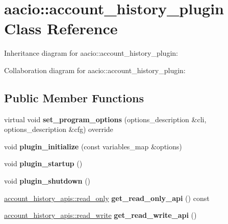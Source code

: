 \hypertarget{classaacio_1_1account__history__plugin}{}\section{aacio\+:\+:account\+\_\+history\+\_\+plugin Class Reference}
\label{classaacio_1_1account__history__plugin}


Inheritance diagram for aacio\+:\+:account\+\_\+history\+\_\+plugin\+:


Collaboration diagram for aacio\+:\+:account\+\_\+history\+\_\+plugin\+:
\subsection*{Public Member Functions}
\begin{DoxyCompactItemize}
\item 
\mbox{\label{classaacio_1_1account__history__plugin_a989ade7520170adb9238e6f84eca4984}} 
virtual void {\bfseries set\+\_\+program\+\_\+options} (options\+\_\+description \&cli, options\+\_\+description \&cfg) override
\item 
\mbox{\label{classaacio_1_1account__history__plugin_afe62f46f0268f571dbc670306050a225}} 
void {\bfseries plugin\+\_\+initialize} (const variables\+\_\+map \&options)
\item 
\mbox{\label{classaacio_1_1account__history__plugin_a11153dd33ce8928989bcb833d2fe9339}} 
void {\bfseries plugin\+\_\+startup} ()
\item 
\mbox{\label{classaacio_1_1account__history__plugin_a9af35e9a78b309b924b684654ca0046c}} 
void {\bfseries plugin\+\_\+shutdown} ()
\item 
\mbox{\label{classaacio_1_1account__history__plugin_a81b340e40a2f03cd2b73ee59c18fc015}} 
\mbox{\hyperlink{classaacio_1_1account__history__apis_1_1read__only}{account\+\_\+history\+\_\+apis\+::read\+\_\+only}} {\bfseries get\+\_\+read\+\_\+only\+\_\+api} () const
\item 
\mbox{\label{classaacio_1_1account__history__plugin_ae70741690a93de0292429a243262cf24}} 
\mbox{\hyperlink{classaacio_1_1account__history__apis_1_1read__write}{account\+\_\+history\+\_\+apis\+::read\+\_\+write}} {\bfseries get\+\_\+read\+\_\+write\+\_\+api} ()
\end{DoxyCompactItemize}
